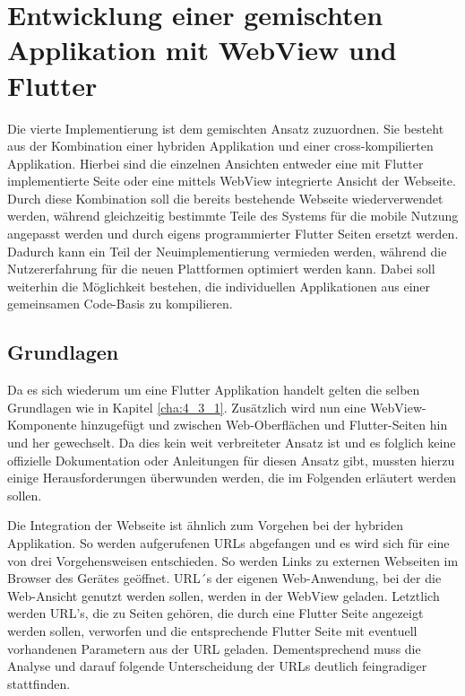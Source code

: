 \section{Entwicklung einer gemischten Applikation mit WebView und Flutter}
Die vierte Implementierung ist dem gemischten Ansatz zuzuordnen. Sie besteht aus der Kombination einer hybriden Applikation und einer cross-kompilierten Applikation.
Hierbei sind die einzelnen Ansichten entweder eine mit Flutter implementierte Seite oder eine mittels WebView integrierte Ansicht der Webseite.
Durch diese Kombination soll die bereits bestehende Webseite wiederverwendet werden, während gleichzeitig bestimmte Teile des Systems für die mobile Nutzung angepasst werden und durch eigens programmierter Flutter Seiten ersetzt werden.
Dadurch kann ein Teil der Neuimplementierung vermieden werden, während die Nutzererfahrung für die neuen Plattformen optimiert werden kann.
Dabei soll weiterhin die Möglichkeit bestehen, die individuellen Applikationen aus einer gemeinsamen Code-Basis zu kompilieren.

\subsection{Grundlagen}
Da es sich wiederum um eine Flutter Applikation handelt gelten die selben Grundlagen wie in Kapitel \ref{cha:4_3_1}.
Zusätzlich wird nun eine WebView-Komponente hinzugefügt und zwischen Web-Oberflächen und Flutter-Seiten hin und her gewechselt.
Da dies kein weit verbreiteter Ansatz ist und es folglich keine offizielle Dokumentation oder Anleitungen für diesen Ansatz gibt, mussten hierzu einige Herausforderungen überwunden werden, die im Folgenden erläutert werden sollen.

Die Integration der Webseite ist ähnlich zum Vorgehen bei der hybriden Applikation. So werden aufgerufenen URLs abgefangen und es wird sich für eine von drei Vorgehensweisen entschieden. So werden Links zu externen Webseiten im Browser des Gerätes geöffnet. URL´s der eigenen Web-Anwendung, bei der die Web-Ansicht genutzt werden sollen, werden in der WebView geladen. Letztlich werden URL's, die zu Seiten gehören, die durch eine Flutter Seite angezeigt werden sollen, verworfen und die entsprechende Flutter Seite mit eventuell vorhandenen Parametern aus der URL geladen. 
Dementsprechend muss die Analyse und darauf folgende Unterscheidung der URLs deutlich feingradiger stattfinden.

